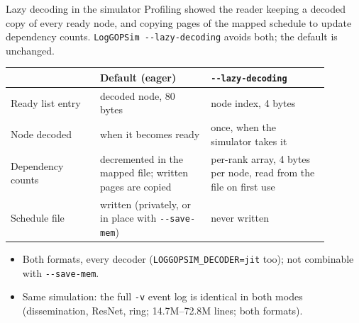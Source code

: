 \documentclass[aspectratio=169,11pt]{beamer}
\begin{document}
\begin{frame}{Lazy decoding in the simulator}
\small
Profiling showed the reader keeping a decoded copy of every ready node, and copying pages of the mapped schedule to update dependency counts. \texttt{LogGOPSim -{}-lazy-decoding} avoids both; the default is unchanged.
\vspace{2mm}

\centering
\footnotesize
\begin{tabular}{L{0.25\linewidth}L{0.31\linewidth}L{0.33\linewidth}}
\toprule
 & \textbf{Default (eager)} & \textbf{\texttt{-{}-lazy-decoding}} \\
\midrule
Ready list entry & decoded node, 80 bytes & node index, 4 bytes \\
Node decoded & when it becomes ready & once, when the simulator takes it \\
Dependency counts & decremented in the mapped file; written pages are copied & per-rank array, 4 bytes per node, read from the file on first use \\
Schedule file & written (privately, or in place with \texttt{-{}-save-mem}) & never written \\
\bottomrule
\end{tabular}
\par\raggedright\vspace{3mm}
\small
\begin{itemize}
\item Both formats, every decoder (\texttt{LOGGOPSIM\_DECODER=jit} too); not combinable with \texttt{-{}-save-mem}.
\item Same simulation: the full \texttt{-v} event log is identical in both modes (dissemination, ResNet, ring; 14.7M--72.8M lines; both formats).
\end{itemize}
\end{frame}
\end{document}
